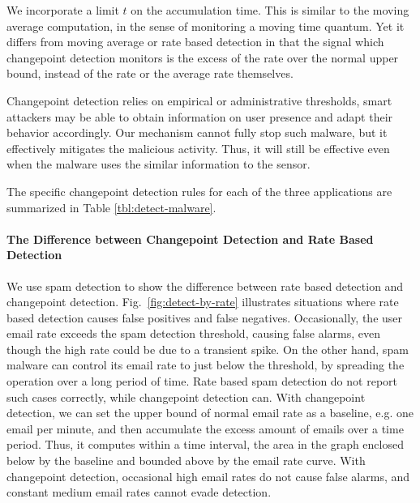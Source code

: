 We incorporate a limit $t$ on the accumulation time.  This is similar to the
moving average computation, in the sense of monitoring a moving time quantum.
Yet it differs from moving average or rate based detection in that the signal
which changepoint detection monitors is the excess of the rate over the normal
upper bound, instead of the rate or the average rate themselves.

Changepoint detection relies on empirical or administrative
thresholds, smart attackers may be able to obtain information on user presence
and adapt their behavior accordingly. Our mechanism cannot fully
stop such malware, but it effectively mitigates the malicious activity.
Thus, it will still be effective even when the malware uses the 
similar information to the sensor.

The specific changepoint detection rules for each of the three applications
are summarized in Table \ref{tbl:detect-malware}. 

\paragraph{The Difference between Changepoint Detection and 
Rate Based Detection}

We use spam detection to show the difference between rate based
detection and changepoint detection. Fig.~\ref{fig:detect-by-rate}
illustrates situations where rate based detection causes false
positives and false negatives. Occasionally, the user email rate
exceeds the spam detection threshold, causing false alarms, even
though the high rate could be due to a transient spike. 
On the other hand, spam malware
can control its email rate to just below the threshold, by spreading
the operation over a long period of time. Rate based spam detection
do not report such cases correctly, while changepoint detection can.
With changepoint detection, we can set the upper bound of normal
email rate as a baseline, e.g. one email per minute, and then accumulate
the excess amount of emails over a time period. Thus, it computes
within a time interval, the area in the graph enclosed below by the
baseline and bounded above by the email rate curve. With changepoint
detection, occasional high email rates do not cause false alarms,
and constant medium email rates cannot evade detection. 
